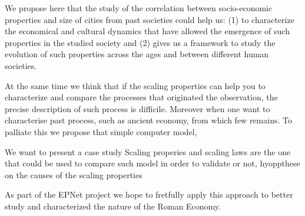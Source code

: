 \documentclass[a4paper,11pt]{article}
\begin{document}
We propose here that the study of the correlation between socio-economic properties and size of cities from past societies could help us: (1) to characterize the economical and cultural dynamics that have allowed the emergence of such properties in the studied society and (2) gives us a framework to study the evolution of such properties across the ages and between different human societies.



At the same time we think that if the scaling properties can help you to characterize and compare the processes that originated the observation, the precise description of such process is difficile. Moreover when one want to characterise past process, such as ancient economy, from which few remains. To palliate this we propose that simple computer model, 


We want to present a case study \cite{carrignon2015modellingthecoevolutionoftradeandcultureinpastsocieties} Scaling properies and scaling laws are the one that could be used to compare such model in order to validate or not, hyoppthese on the causes of the scaling properties

As part of the EPNet project \citep{remesal2014epnet} we hope to fretfully apply this approach to better study and characterized the nature of the Roman Economy.




\end{document}
